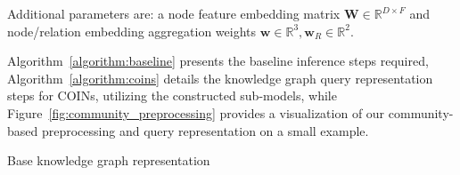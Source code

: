 Additional parameters are: a {node feature embedding matrix} $\mathbf{W} \in \mathbb{R}^{D \times F}$ and {node/relation embedding aggregation weights} $\mathbf{w} \in \mathbb{R}^{3}, \mathbf{w}_R \in \mathbb{R}^{2}$.

Algorithm~\ref{algorithm:baseline} presents the baseline inference steps required, Algorithm~\ref{algorithm:coins} details the knowledge graph query representation steps for COINs, utilizing the constructed sub-models, while Figure~\ref{fig:community_preprocessing} provides a visualization of our community-based preprocessing and query representation on a small example. 

\begin{algorithm}%
    \caption{Base knowledge graph representation}
    \label{algorithm:baseline}
    \begin{algorithmic}[1]
    \end{algorithmic}
\end{algorithm}
 
